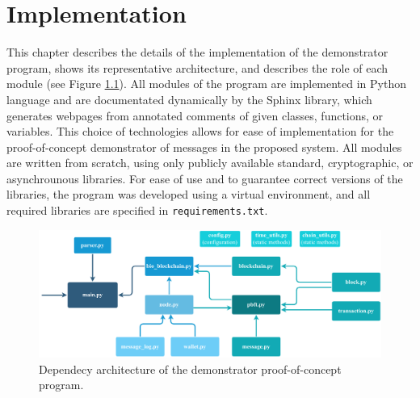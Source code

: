 \chapter{Implementation}
This chapter describes the details of the implementation of the demonstrator program, shows its representative architecture, and describes the role of each module (see Figure \ref{DependencyArchitecture}).
All modules of the program are implemented in Python language and are documentated dynamically by the Sphinx library, which generates webpages from annotated comments of given classes, functions, or variables. This choice of technologies allows for ease of implementation for the proof-of-concept demonstrator of messages in the proposed system. All modules are written from scratch, using only publicly available standard, cryptographic, or asynchrounous libraries. For ease of use and to guarantee correct versions of the libraries, the program was developed using a virtual environment, and all required libraries are specified in \texttt{requirements.txt}.
\begin{figure}[h]
	\centering
	\includegraphics[width=\linewidth]{obrazky-figures/DependencyArchitecture.pdf}
	\caption{Dependecy architecture of the demonstrator proof-of-concept program.}
	\label{DependencyArchitecture}
\end{figure}
